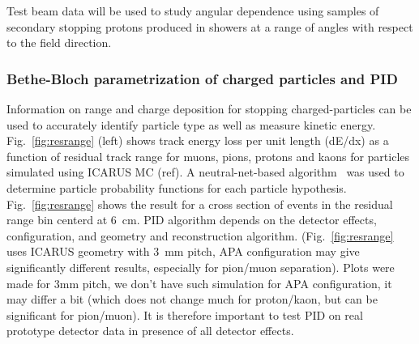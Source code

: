 Test beam data will be used to study angular dependence using 
samples of secondary stopping protons produced in showers at a range of angles with
respect to the field direction.

\subsubsection{Bethe-Bloch parametrization of charged particles and PID}

%
\label{detbeam_pid}


Information on range and charge deposition for stopping charged-particles can be used to 
accurately identify particle type as well as measure kinetic energy. 
Fig.~\ref{fig:resrange}  (left) shows track energy loss per unit length (dE/dx) as a function of residual 
track range for muons, pions, protons and kaons for particles simulated using ICARUS MC (ref).
A neutral-net-based algorithm~\cite{nn_pid,rd_pid}
was used to determine particle probability 
functions for each particle hypothesis. Fig.~\ref{fig:resrange}  shows the result for a cross section of events 
in the residual range bin centerd at 6~cm.
PID algorithm depends on the detector effects, configuration, and geometry and 
reconstruction algorithm. (Fig.~\ref{fig:resrange} uses ICARUS geometry with 3~mm pitch, APA configuration may give significantly
different results, especially for pion/muon separation). 
Plots were made for 3mm pitch, we don't have such simulation for APA configuration, it may differ a bit (which does not change much for proton/kaon, but can be significant for pion/muon).
It is therefore important to test PID on real prototype
detector data in presence of all detector effects.


